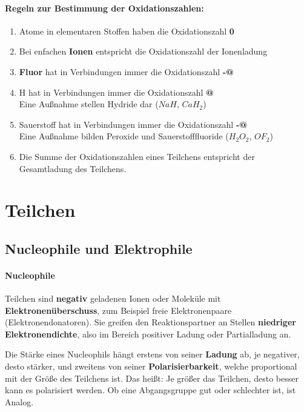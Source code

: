 \documentclass[a4paper]{report}
\makeatletter
\newcommand*{\rom}[1]{\expandafter\@slowromancap\romannumeral #1@}
\makeatother
\begin{document}
\paragraph{Regeln zur Bestimmung der Oxidationszahlen:}
\begin{enumerate}
    \item Atome in elementaren Stoffen haben die Oxidationszahl \textbf{0}
    \item Bei enfachen \textbf{Ionen} entspricht die Oxidationszahl der Ionenladung
    \item \textbf{Fluor} hat in Verbindungen immer die Oxidationszahl \textbf{-\rom{1}}
    \item H hat in Verbindungen immer die Oxidationszahl \textbf{\rom{1}}\\
            Eine Außnahme stellen Hydride dar ($NaH$, $CaH_2$)
    \item Sauerstoff hat in Verbindungen immer die Oxidationszahl \textbf{-\rom{2}}\\
            Eine Außnahme bilden Peroxide und Sauerstofffluoride ($H_2O_2$, $OF_2$)
    \item Die Summe der Oxidationszahlen eines Teilchens entspricht der Gesamtladung des Teilchens.
\end{enumerate}


\section{Teilchen}
\subsection{Nucleophile und Elektrophile}
\paragraph{Nucleophile} 
Teilchen sind \textbf{negativ} geladenen Ionen oder Moleküle mit \textbf{Elektronenüberschuss}, zum Beispiel freie Elektronenpaare (Elektronendonatoren).
Sie greifen den Reaktionspartner an Stellen \textbf{niedriger Elektronendichte}, also im Bereich positiver Ladung oder Partialladung an.

Die Stärke eines Nucleophils hängt erstens von seiner \textbf{Ladung} ab, je negativer, desto stärker, und zweitens von seiner
\textbf{Polarisierbarkeit}, welche proportional mit der Größe des Teilchens ist. Das heißt: Je größer das Teilchen, desto besser
kann es polarisiert werden. Ob eine Abgangsgruppe gut oder schlechter ist, ist Analog.
\end{document}
